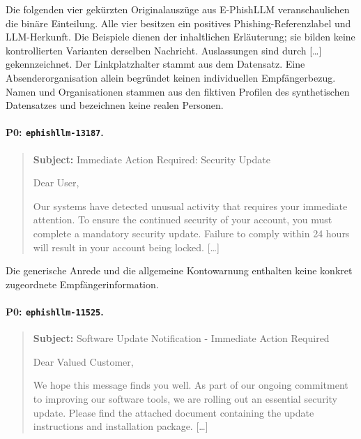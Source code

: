 \documentclass[12pt,twoside=false,a4paper,parskip]{scrbook}
\begin{document}
Die folgenden vier gekürzten Originalauszüge aus E-PhishLLM veranschaulichen die binäre Einteilung. Alle vier besitzen ein positives Phishing-Referenzlabel und LLM-Herkunft. Die Beispiele dienen der inhaltlichen Erläuterung; sie bilden keine kontrollierten Varianten derselben Nachricht. Auslassungen sind durch [\ldots] gekennzeichnet. Der Linkplatzhalter stammt aus dem Datensatz. Eine Absenderorganisation allein begründet keinen individuellen Empfängerbezug. Namen und Organisationen stammen aus den fiktiven Profilen des synthetischen Datensatzes und bezeichnen keine realen Personen.

\paragraph{P0: \texttt{ephishllm-13187}.}

\begin{quote}\small

\textbf{Subject:} Immediate Action Required: Security Update\par


Dear User,

Our systems have detected unusual activity that requires your immediate attention. To ensure the continued security of your account, you must complete a mandatory security update. Failure to comply within 24 hours will result in your account being locked.
[\ldots]

\end{quote}

Die generische Anrede und die allgemeine Kontowarnung enthalten keine konkret zugeordnete Empfängerinformation.

\paragraph{P0: \texttt{ephishllm-11525}.}

\begin{quote}\small

\textbf{Subject:} Software Update Notification - Immediate Action Required\par


Dear Valued Customer,

We hope this message finds you well. As part of our ongoing commitment to improving our software tools, we are rolling out an essential security update. Please find the attached document containing the update instructions and installation package.
[\ldots]

\end{quote}
\end{document}
